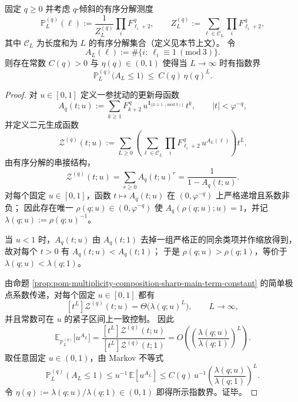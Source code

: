 \begin{theorem}\label{thm:pom-multiplicity-composition-mod3-sparsity}
固定 \(q\ge 0\) 并考虑 \(q\)-倾斜的有序分解测度
\[
\mathbb{P}^{(q)}_L(\boldsymbol{\ell})
:=\frac{1}{Z_L^{(q)}}\prod_{i}F_{\ell_i+2}^{\,q},
\qquad
Z_L^{(q)}:=\sum_{\boldsymbol{\ell}\in\mathcal C_L}\prod_i F_{\ell_i+2}^{\,q},
\]
其中 \(\mathcal C_L\) 为长度和为 \(L\) 的有序分解集合（定义见本节上文）。
令
\[
A_L(\boldsymbol{\ell})
:=\#\{i:\ \ell_i\equiv 1\ (\mathrm{mod}\ 3)\}.
\]
则存在常数 \(C(q)>0\) 与 \(\eta(q)\in(0,1)\) 使得当 \(L\to\infty\) 时有指数界
\[
\mathbb{P}^{(q)}_L\!\bigl(A_L\le 1\bigr)\ \le\ C(q)\,\eta(q)^L.
\]
\end{theorem}
\begin{proof}
对 \(u\in[0,1]\) 定义一参扰动的更新母函数
\[
A_{q}(t;u):=\sum_{k\ge 1}F_{k+2}^{\,q}\,u^{\mathbf 1_{\{k\equiv 1\ (\mathrm{mod}\ 3)\}}}\,t^k,
\qquad |t|<\varphi^{-q},
\]
并定义二元生成函数
\[
\mathcal Z^{(q)}(t;u):=\sum_{L\ge 0}\left(\sum_{\boldsymbol{\ell}\in\mathcal C_L}\prod_i F_{\ell_i+2}^{\,q}\,u^{A_L(\boldsymbol{\ell})}\right)t^L.
\]
由有序分解的串接结构，
\[
\mathcal Z^{(q)}(t;u)=\sum_{r\ge 0}A_q(t;u)^r=\frac{1}{1-A_q(t;u)}.
\]
对每个固定 \(u\in[0,1]\)，函数 \(t\mapsto A_q(t;u)\) 在 \((0,\varphi^{-q})\) 上严格递增且系数非负；
因此存在唯一 \(\rho(q;u)\in(0,\varphi^{-q})\) 使 \(A_q(\rho(q;u);u)=1\)，并记 \(\lambda(q;u):=\rho(q;u)^{-1}\)。
\par
当 \(u<1\) 时，\(A_q(t;u)\) 由 \(A_q(t;1)\) 去掉一组严格正的同余类项并作缩放得到，故对每个 \(t>0\) 有 \(A_q(t;u)<A_q(t;1)\)；
于是 \(\rho(q;u)>\rho(q;1)\)，等价于 \(\lambda(q;u)<\lambda(q;1)\)。
\par
由命题 \ref{prop:pom-multiplicity-composition-sharp-main-term-constant} 的简单极点系数传递，对每个固定 \(u\in[0,1]\) 都有
\[
[t^L]\mathcal Z^{(q)}(t;u)=\Theta\!\bigl(\lambda(q;u)^L\bigr),
\qquad L\to\infty,
\]
并且常数可在 \(u\) 的紧子区间上一致控制。
因此
\[
\mathbb{E}_{\mathbb P^{(q)}_L}\!\bigl[u^{A_L}\bigr]
=\frac{[t^L]\mathcal Z^{(q)}(t;u)}{[t^L]\mathcal Z^{(q)}(t;1)}
=O\!\left(\left(\frac{\lambda(q;u)}{\lambda(q;1)}\right)^{\!L}\right).
\]
取任意固定 \(u\in(0,1)\)，由 Markov 不等式
\[
\mathbb{P}^{(q)}_L(A_L\le 1)
\le u^{-1}\,\mathbb{E}[u^{A_L}]
\le C(q)\,u^{-1}\left(\frac{\lambda(q;u)}{\lambda(q;1)}\right)^{\!L}.
\]
令 \(\eta(q):=\lambda(q;u)/\lambda(q;1)\in(0,1)\) 即得所示指数界。证毕。
\end{proof}

